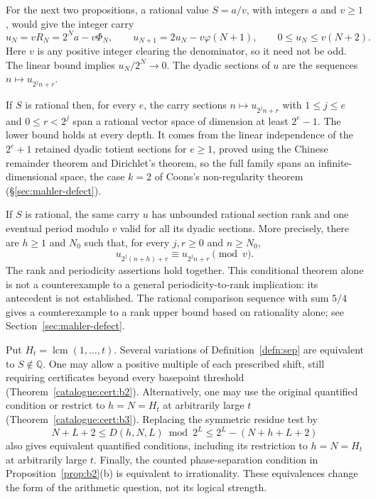 For the next two propositions, a rational value $S=a/v$, with integers
$a$ and $v\ge1$, would give the integer carry
\[
 u_N=vR_N=2^Na-v\Phi_N,\qquad
 u_{N+1}=2u_N-v\varphi(N+1),\qquad 0\le u_N\le v(N+2).
\]
Here $v$ is any positive integer clearing the denominator, so it
need not be odd. The linear bound implies $u_N/2^N\to0$.
The dyadic sections of $u$ are the sequences $n\mapsto u_{2^jn+r}$.

\begin{prop}
\label{prop:rank}
If $S$ is rational then, for every $e$, the carry sections
$n\mapsto u_{2^jn+r}$ with $1\le j\le e$ and $0\le r<2^j$ span a rational
vector space of dimension at least $2^{e}-1$.
The lower bound holds at every depth. It comes from the linear independence
of the $2^e+1$ retained dyadic totient sections for $e\ge1$, proved using
the Chinese remainder theorem and Dirichlet's theorem,
so the full family spans an infinite-dimensional space,
the case $k=2$ of Coons's non-regularity theorem (\S\ref{sec:mahler-defect}).
\end{prop}

\begin{prop}
\label{prop:period-not-rank}
If $S$ is rational, the same carry $u$ has unbounded rational section rank
and one eventual period modulo $v$ valid for all its dyadic sections.
More precisely, there are $h\ge1$ and $N_0$ such that, for every $j,r\ge0$
and $n\ge N_0$,
\[
 u_{2^j(n+h)+r}\equiv u_{2^jn+r}\pmod v.
\]
The rank and periodicity assertions hold together.
This conditional theorem alone is not a counterexample to a general
periodicity-to-rank implication: its antecedent is not established.
The rational comparison sequence with sum $5/4$ gives a
counterexample to a rank upper bound based on rationality alone;
see Section~\ref{sec:mahler-defect}.
\end{prop}

\begin{prop}
\label{prop:iffs}
Put $H_t=\operatorname{lcm}(1,\ldots,t)$. Several variations of
Definition~\ref{defn:sep} are equivalent to $S\notin\mathbb Q$. One may allow a positive multiple of each prescribed
shift, still requiring certificates beyond every basepoint threshold
(Theorem~\ref{catalogue:cert:b2}).
Alternatively, one may use the original quantified condition
or restrict to $h=N=H_t$ at arbitrarily large $t$
(Theorem~\ref{catalogue:cert:b3}).
Replacing the symmetric residue test by
\[
 N+L+2\le D(h,N,L)\bmod2^L\le2^L-(N+h+L+2)
\]
also gives equivalent quantified conditions, including its restriction to
$h=N=H_t$ at arbitrarily large $t$.
Finally, the counted phase-separation condition in
Proposition~\ref{prop:b2}(b) is equivalent to irrationality.
These equivalences change the form of the arithmetic question, not its
logical strength.
\end{prop}

